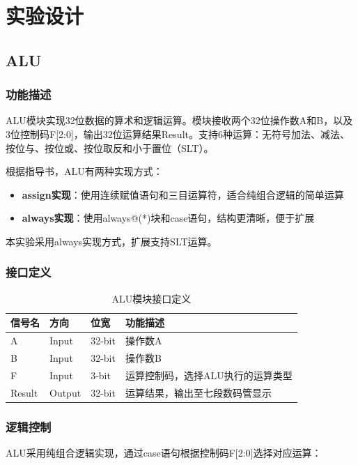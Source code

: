\section{实验设计}

\subsection{ALU}\label{sub:alu}

\subsubsection{功能描述}
ALU模块实现32位数据的算术和逻辑运算。模块接收两个32位操作数A和B，以及3位控制码F[2:0]，输出32位运算结果Result。支持6种运算：无符号加法、减法、按位与、按位或、按位取反和小于置位（SLT）。

根据指导书，ALU有两种实现方式：
\begin{itemize}
    \item \textbf{assign实现}：使用连续赋值语句和三目运算符，适合纯组合逻辑的简单运算
    \item \textbf{always实现}：使用always@(*)块和case语句，结构更清晰，便于扩展\end{itemize}

本实验采用always实现方式，扩展支持SLT运算。

\subsubsection{接口定义}

\begin{table}[htp]
\caption{ALU模块接口定义}\label{tab:alu_signal}
\begin{center}
    \begin{tabular}{|l|l|l|p{6cm}|}
    \hline
    \textbf{信号名} & \textbf{方向} & \textbf{位宽} & \textbf{功能描述}\\ \hline \hline
    A      & Input  & 32-bit & 操作数A \\
    B      & Input  & 32-bit & 操作数B \\
    F      & Input  & 3-bit  & 运算控制码，选择ALU执行的运算类型 \\
    Result & Output & 32-bit & 运算结果，输出至七段数码管显示 \\
    \hline
    \end{tabular}
\end{center}
\end{table}

\subsubsection{逻辑控制}
ALU采用纯组合逻辑实现，通过case语句根据控制码F[2:0]选择对应运算：

